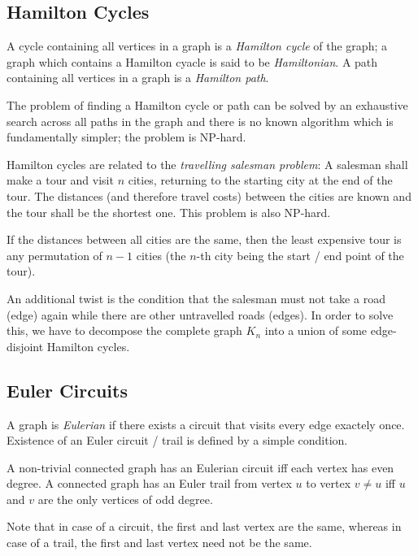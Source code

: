 
\subsection{Hamilton Cycles}

A cycle containing all vertices in a graph is a \emph{Hamilton cycle} of the graph; a graph which contains a Hamilton cyacle is said to be \emph{Hamiltonian}. A path containing all vertices in a graph is a \emph{Hamilton path}.

The problem of finding a Hamilton cycle or path can be solved by an exhaustive search across all paths in the graph and there is no known algorithm which is fundamentally simpler; the problem is NP-hard.

Hamilton cycles are related to the \emph{travelling salesman problem}: A salesman shall make a tour and visit $n$ cities, returning to the starting city at the end of the tour. The distances (and therefore travel costs) between the cities are known and the tour shall be the shortest one. This problem is also NP-hard.

If the distances between all cities are the same, then the least expensive tour is any permutation of $n-1$ cities (the $n$-th city being the start / end point of the tour).

An additional twist is the condition that the salesman must not take a road (edge) again while there are other untravelled roads (edges). In order to solve this, we have to decompose the complete graph $K_n$ into a union of some edge-disjoint Hamilton cycles. 


\subsection{Euler Circuits}

A graph is \emph{Eulerian} if there exists a circuit that visits every edge exactely once. Existence of an Euler circuit / trail is defined by a simple condition.

\begin{theorem} A non-trivial connected graph has an Eulerian circuit iff each vertex has even degree. A connected graph has an Euler trail from vertex $u$ to vertex $v \neq u$ iff $u$ and $v$ are the only vertices of odd degree.
\end{theorem}

Note that in case of a circuit, the first and last vertex are the same, whereas in case of a trail, the first and last vertex need not be the same.

